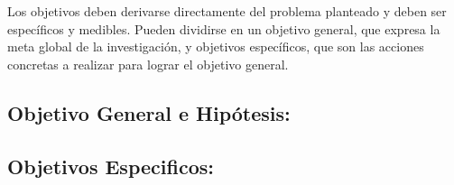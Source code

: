 Los objetivos deben derivarse directamente del problema planteado y
deben ser específicos y medibles. Pueden dividirse en un objetivo
general, que expresa la meta global de la investigación, y objetivos
específicos, que son las acciones concretas a realizar para lograr el
objetivo general.

\subsection{Objetivo General e Hipótesis:}
\lipsum[1-1]
\subsection{Objetivos Especificos:}
\lipsum[1-1]
